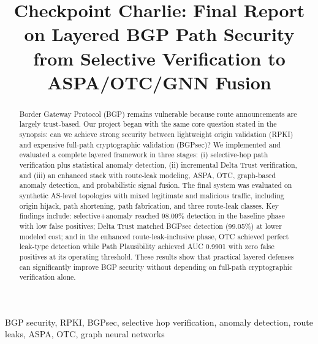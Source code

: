\documentclass[conference]{IEEEtran}
\begin{document}
\title{Checkpoint Charlie: Final Report on Layered BGP Path Security from Selective Verification to ASPA/OTC/GNN Fusion}

\author{
\and
{}
}

\maketitle

\begin{abstract}
Border Gateway Protocol (BGP) remains vulnerable because route announcements are largely trust-based. Our project began with the same core question stated in the synopsis: can we achieve strong security between lightweight origin validation (RPKI) and expensive full-path cryptographic validation (BGPsec)? We implemented and evaluated a complete layered framework in three stages: (i) selective-hop path verification plus statistical anomaly detection, (ii) incremental Delta Trust verification, and (iii) an enhanced stack with route-leak modeling, ASPA, OTC, graph-based anomaly detection, and probabilistic signal fusion. The final system was evaluated on synthetic AS-level topologies with mixed legitimate and malicious traffic, including origin hijack, path shortening, path fabrication, and three route-leak classes. Key findings include: selective+anomaly reached 98.09\% detection in the baseline phase with low false positives; Delta Trust matched BGPsec detection (99.05\%) at lower modeled cost; and in the enhanced route-leak-inclusive phase, OTC achieved perfect leak-type detection while Path Plausibility achieved AUC 0.9901 with zero false positives at its operating threshold. These results show that practical layered defenses can significantly improve BGP security without depending on full-path cryptographic verification alone.
\end{abstract}

\begin{IEEEkeywords}
BGP security, RPKI, BGPsec, selective hop verification, anomaly detection, route leaks, ASPA, OTC, graph neural networks
\end{IEEEkeywords}
\end{document}
